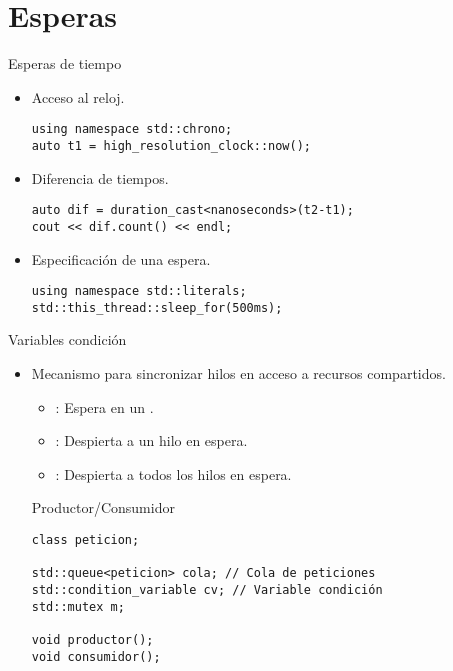 \section{Esperas}

\begin{frame}[t,fragile]{Esperas de tiempo}
\begin{itemize}
  \item Acceso al reloj.
\begin{lstlisting}
using namespace std::chrono;
auto t1 = high_resolution_clock::now();
\end{lstlisting}
  \item Diferencia de tiempos.
\begin{lstlisting}
auto dif = duration_cast<nanoseconds>(t2-t1);
cout << dif.count() << endl;
\end{lstlisting}
  \item Especificación de una espera.
\begin{lstlisting}
using namespace std::literals;
std::this_thread::sleep_for(500ms);
\end{lstlisting}
\end{itemize}
\end{frame}

\begin{frame}[t,fragile]{Variables condición}
\begin{itemize}
  \item Mecanismo para sincronizar hilos en acceso a recursos compartidos.
    \begin{itemize}
      \item {}: Espera en un .
      \item {}: Despierta a un hilo en espera.
      \item {}: Despierta a todos los hilos en espera.
    \end{itemize}
\begin{block}{Productor/Consumidor}
\begin{lstlisting}
class peticion;

std::queue<peticion> cola; // Cola de peticiones
std::condition_variable cv; // Variable condición
std::mutex m;

void productor();
void consumidor();
\end{lstlisting}
\end{block}
\end{itemize}
\end{frame}


